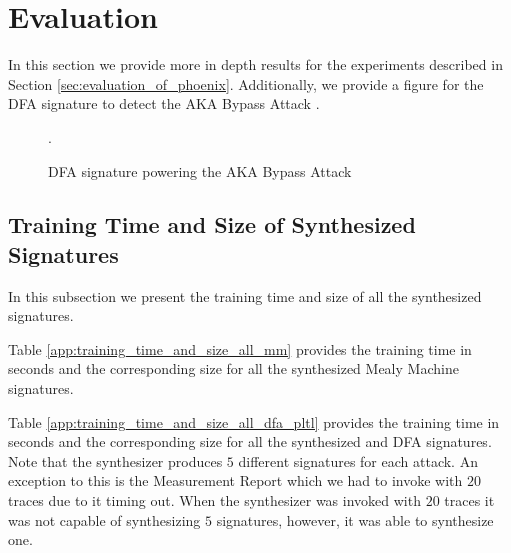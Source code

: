 \section{Evaluation}
\label{app:appendix_evaluation_section}
In this section we provide more in depth results for the experiments described
in Section \ref{sec:evaluation_of_phoenix}. Additionally, we provide a figure
for the DFA signature to detect the AKA Bypass Attack \cite{kim_ltefuzz_sp19}.
%

\clearpage
\begin{figure}[t]
\centering
	\caption{DFA signature powering the AKA Bypass Attack \cite{kim_ltefuzz_sp19}}.
	\label{fig:aka_bypass_dfa}
\end{figure}
\clearpage


\subsection{Training Time and Size of Synthesized Signatures}
\label{app:training_time_and_size_all_dfa_pltl_section}

In this subsection we present the training time and size of all the synthesized
signatures.


Table \ref{app:training_time_and_size_all_mm} provides the training
time in seconds and the corresponding size for all the synthesized Mealy Machine
signatures.

Table \ref{app:training_time_and_size_all_dfa_pltl} provides the training time
in seconds and the corresponding size for all the synthesized \pltl and DFA
signatures. Note that the \pltl synthesizer produces $5$ different signatures
for each attack. An exception to this is the Measurement Report which we
had to invoke with $20$ traces due to it timing out. When the synthesizer
was invoked with $20$ traces it was not capable of synthesizing $5$ signatures,
however, it was able to synthesize one.


